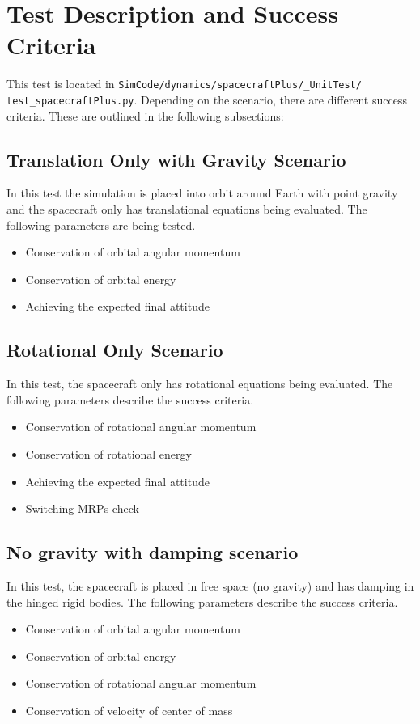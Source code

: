 \section{Test Description and Success Criteria}
This test is located in \texttt{SimCode/dynamics/spacecraftPlus/\_UnitTest/\newline
test\_spacecraftPlus.py}. Depending on the scenario, there are different success criteria. These are outlined in the following subsections:
\subsection{Translation Only with Gravity Scenario}
In this test the simulation is placed into orbit around Earth with point gravity and the spacecraft only has translational equations being evaluated. The following parameters are being tested. 
\begin{itemize}
	\item Conservation of orbital angular momentum
	\item Conservation of orbital energy
	\item Achieving the expected final attitude
\end{itemize}

\subsection{Rotational Only Scenario}
In this test, the spacecraft only has rotational equations being evaluated. The following parameters describe the success criteria.
\begin{itemize}
\item Conservation of rotational angular momentum
\item Conservation of rotational energy
\item Achieving the expected final attitude
\item Switching MRPs check
\end{itemize}

\subsection{No gravity with damping scenario}
In this test, the spacecraft is placed in free space (no gravity) and has damping in the hinged rigid bodies. The following parameters describe the success criteria.
\begin{itemize}
\item Conservation of orbital angular momentum
\item Conservation of orbital energy
\item Conservation of rotational angular momentum
\item Conservation of velocity of center of mass
\end{itemize}

